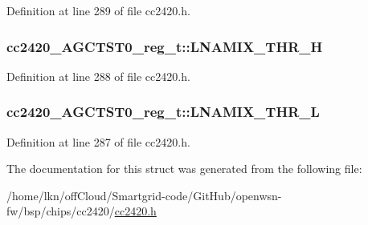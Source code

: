 Definition at line 289 of file cc2420.\+h.

\subsubsection[{\texorpdfstring{L\+N\+A\+M\+I\+X\+\_\+\+T\+H\+R\+\_\+H}{LNAMIX_THR_H}}]{ cc2420\+\_\+\+A\+G\+C\+T\+S\+T0\+\_\+reg\+\_\+t\+::\+L\+N\+A\+M\+I\+X\+\_\+\+T\+H\+R\+\_\+H}\hypertarget{structcc2420___a_g_c_t_s_t0__reg__t_a1261ba072fa60340b6f2f66f0df2238b}{}\label{structcc2420___a_g_c_t_s_t0__reg__t_a1261ba072fa60340b6f2f66f0df2238b}


Definition at line 288 of file cc2420.\+h.

\subsubsection[{\texorpdfstring{L\+N\+A\+M\+I\+X\+\_\+\+T\+H\+R\+\_\+L}{LNAMIX_THR_L}}]{ cc2420\+\_\+\+A\+G\+C\+T\+S\+T0\+\_\+reg\+\_\+t\+::\+L\+N\+A\+M\+I\+X\+\_\+\+T\+H\+R\+\_\+L}\hypertarget{structcc2420___a_g_c_t_s_t0__reg__t_aa6c95f07f18589a6f48185366d139930}{}\label{structcc2420___a_g_c_t_s_t0__reg__t_aa6c95f07f18589a6f48185366d139930}


Definition at line 287 of file cc2420.\+h.



The documentation for this struct was generated from the following file\+:\begin{DoxyCompactItemize}
\item 
/home/lkn/off\+Cloud/\+Smartgrid-\/code/\+Git\+Hub/openwsn-\/fw/bsp/chips/cc2420/\hyperlink{cc2420_8h}{cc2420.\+h}\end{DoxyCompactItemize}
